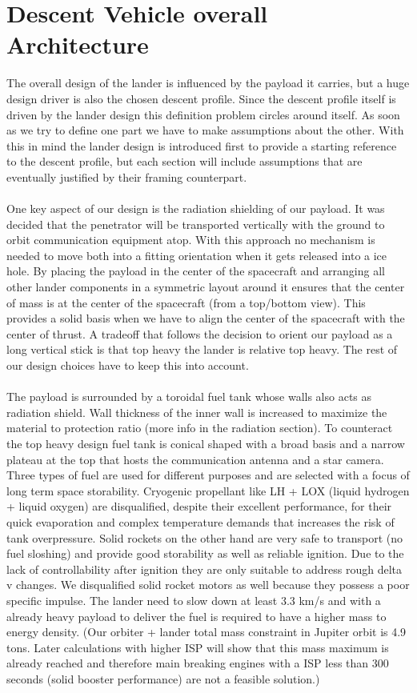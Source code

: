 \section{Descent Vehicle overall Architecture}
The overall design of the lander is influenced by the payload it carries, but a huge design driver is also the chosen descent profile. Since the descent profile itself is driven by the lander design this definition problem circles around itself. As soon as we try to define one part we have to make assumptions about the other. With this in mind the lander design is introduced first to provide a starting reference to the descent profile, but each section will include assumptions that are eventually justified by their framing counterpart.\\
\\
One key aspect of our design is the radiation shielding of our payload. It was decided that the penetrator will be transported vertically with the ground to orbit communication equipment atop. With this approach no mechanism is needed to move both into a fitting orientation when it gets released into a ice hole. By placing the payload in the center of the spacecraft and arranging all other lander components in a symmetric layout around it ensures that the center of mass is at the center of the spacecraft (from a top/bottom view). This provides a solid basis when we have to align the center of the spacecraft with the center of thrust. A tradeoff that follows the decision to orient our payload as a long vertical stick is that top heavy the lander is relative top heavy. The rest of our design choices have to keep this into account.\\
\\
The payload is surrounded by a toroidal fuel tank whose walls also acts as radiation shield. Wall thickness of the inner wall is increased to maximize the material to protection ratio (more info in the radiation section). To counteract the top heavy design fuel tank is conical shaped with a broad basis and a narrow plateau at the top that hosts the communication antenna and a star camera. 
Three types of fuel are used for different purposes and are selected with a focus of long term space storability. Cryogenic propellant like LH + LOX (liquid hydrogen + liquid oxygen) are disqualified, despite their excellent performance, for their quick evaporation and complex temperature demands that increases the risk of tank overpressure. Solid rockets on the other hand are very safe to transport (no fuel sloshing) and provide good storability as well as reliable ignition. Due to the lack of controllability after ignition they are only suitable to address rough delta v changes. We disqualified solid rocket motors as well because they possess a poor specific impulse. The lander need to slow down at least 3.3 km/s  and with a already heavy payload to deliver the fuel is required to have a higher mass to energy density. (Our orbiter + lander total mass constraint in Jupiter orbit is 4.9 tons. Later calculations with higher ISP will show that this mass maximum is already reached and therefore main breaking engines with a ISP less than 300 seconds (solid booster performance) are not a feasible solution.) \\
